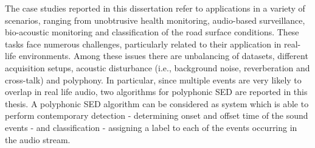 \documentclass[a4print,english,lof,lot]{univpmphdthesis}
\begin{document}
\begin{thesisabstract}
The case studies reported in this dissertation refer to applications in a variety of scenarios, ranging from unobtrusive health monitoring, audio-based surveillance, bio-acoustic monitoring and classification of
the road surface conditions. These tasks face numerous challenges, particularly related to their application in real-life environments. Among these issues there are unbalancing of datasets, different acquisition setups, acoustic disturbance (i.e., background noise, reverberation and cross-talk) and polyphony. In particular, since multiple events are very likely to overlap in real life audio, two algorithms for polyphonic SED are reported in this thesis. A polyphonic SED algorithm can be considered as system which is able to perform contemporary detection - determining onset and offset time of the sound events - and classification - assigning a label to each of the events occurring in the audio stream.

\end{thesisabstract}

\thesistoc

\mainmatter

\graphicspath{{1_introduction/}}


\graphicspath{{2_background/}}


\graphicspath{{3_datasets_and_evaluation/}}


\graphicspath{{4_sound_event_classification/}}


\graphicspath{{5_sound_event_detection/}}


\graphicspath{{6_polyphonic_sound_event_detection/}}


\graphicspath{{7_other_contributions/}}



\backmatter

\cleardoublepage
{}
{}




\end{document}
